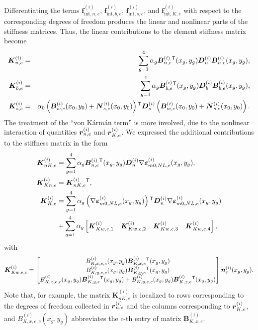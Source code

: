 \documentclass[11pt]{article}
\newcommand{\strain}{\varepsilon}
\newcommand{\mONLe}{_{m0,NL,e}}
\newcommand{\Dn}{\mtrx{D}_n}
\newcommand{\Db}{\mtrx{D}_b}
\newcommand{\Ds}{\mtrx{D}_s}
\newcommand{\K}{K}
\newcommand{\layer}[1]{^{(#1)}}
\newcommand{\el}{_e}
\newcommand{\elen}{_{n,e}}
\newcommand{\eleb}{_{b,e}}
\newcommand{\eles}{_{s,e}}
\newcommand{\eleNL}{_{K,e}}
\newcommand{\eleNLg}{_{Kw,e,c}}
\newcommand{\eleNLc}[1]{_{Kw,e,#1}}
\newcommand{\eleNLx}{_{K,x,e}}
\newcommand{\eleNLy}{_{K,y,e}}
\newcommand{\eleNLxg}{_{K,x,e,c}}
\newcommand{\eleNLyg}{_{K,y,e,c}}
\newcommand{\elenNL}{_{nK,e}}
\newcommand{\eleNLn}{_{Kn,e}}
\newcommand{\ielen}{_{\mathrm{int},n,e}}
\newcommand{\ieleb}{_{\mathrm{int},b,e}}
\newcommand{\ieles}{_{\mathrm{int},s,e}}
\newcommand{\ieleNL}{_{\mathrm{int},K,e}}
\newcommand{\M}[1]{{\boldsymbol #1}}
\newcommand{\wf}{\alpha}
\newcommand{\elew}{_{w,e}}
\begin{document}
Differentiating the terms $\M{f}\layer{i}\ielen$, $\M{f}\layer{i}\ieleb$, $\M{f}\layer{i}\ieles$, and $\M{f}\layer{i}\ieleNL$ with respect to the corresponding degrees of freedom
produces the linear and nonlinear parts of the stiffness matrices. Thus, the linear contributions to the element
stiffness matrix become
\begin{eqnarray*}
\M{\K}\layer{i}\elen &=& \sum_{g=1}^4 \wf_g\M{B}\layer{i}\elen\trn(x_g,y_g) \Dn\layer{i} \M{B}\layer{i}\elen(x_g,y_g),\\
\M{\K}\layer{i}\eleb &=& \sum_{g=1}^4 \wf_g\M{B}\layer{i}\eleb\trn(x_g,y_g) \Db\layer{i} \M{B}\layer{i}\eleb(x_g,y_g),\\
\M{\K}\layer{i}\eles &=& \wf_0\left( \M{B}\layer{i}\elew(x_0,y_0) + \M{N}\layer{i}\eles(x_0,y_0) \right)\trn
\Ds\layer{i} \left( \M{B}\layer{i}\elew(x_0,y_0) + \M{N}\layer{i}\eles(x_0,y_0) \right).
\end{eqnarray*}
The treatment of the ``von K\'{a}rm\'{a}n term'' is more involved, due to the nonlinear interaction of quantities
$\mtrx{r}\layer{i}\elen$ and $\mtrx{r}\layer{i}\eleNL$. We expressed the additional contributions to the stiffness matrix in the form
\begin{align*}
\M{\K}\layer{i}\elenNL &= \sum_{g=1}^4 \wf_g
\M{B}\layer{i}\elen\trn(x_g,y_g) \Dn\layer{i} \nabla\mtrx{\strain}\mONLe\layer{i}(x_g,y_g),\\
\M{\K}\layer{i}\eleNLn &= \M{\K}\layer{i}\elenNL \trn,
\\
\M{\K}\layer{i}\eleNL &= \sum_{g=1}^4 \wf_g
\left( \nabla\mtrx{\strain}\mONLe\layer{i}(x_g,y_g) \right) \trn
\Dn\layer{i}
\nabla\mtrx{\strain}\mONLe\layer{i}(x_g,y_g)\\
&+
\sum_{g=1}^4 \wf_g
\begin{bmatrix}
\M{\K}\layer{i}\eleNLc{1} &
\M{\K}\layer{i}\eleNLc{2} &
\M{\K}\layer{i}\eleNLc{3} &
\M{\K}\layer{i}\eleNLc{4}
\end{bmatrix},
\end{align*}
with
\begin{eqnarray*}
\M{\K}\layer{i}\eleNLg
 =
\begin{bmatrix}
{B}\layer{i}\eleNLxg(x_g,y_g) \M{B}\layer{i}\eleNLx\trn(x_g,y_g)\\
{B}\layer{i}\eleNLyg(x_g,y_g) \M{B}\layer{i}\eleNLy\trn(x_g,y_g)\\
{B}\layer{i}\eleNLxg(x_g,y_g) \M{B}\layer{i}\eleNLy\trn(x_g,y_g) +
{B}\layer{i}\eleNLyg(x_g,y_g) \M{B}\layer{i}\eleNLx\trn(x_g,y_g)
\end{bmatrix}
\M{n}\layer{i}\el(x_g, y_g).
\end{eqnarray*}
Note that, for example, the matrix $\M{\K}\layer{i}\elenNL$ is localized to rows corresponding to the degrees of freedom collected in $\mtrx{r}\layer{i}\elen$ and the columns corresponding to $\mtrx{r}\layer{i}\eleNL$, and ${B}\layer{i}\eleNLxg(x_g,y_g)$ abbreviates the $c$-th entry of matrix $\M{B}\layer{i}\eleNLx$. 
\end{document}

